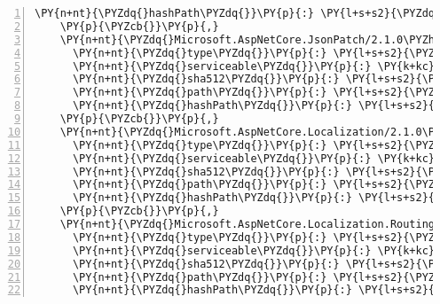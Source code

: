 \begin{Verbatim}[commandchars=\\\{\},numbers=left,firstnumber=1,stepnumber=1,numberblanklines=0]
      \PY{n+nt}{\PYZdq{}hashPath\PYZdq{}}\PY{p}{:} \PY{l+s+s2}{\PYZdq{}microsoft.aspnetcore.identity.ui.2.1.0\PYZhy{}rc1\PYZhy{}final.nupkg.sha512\PYZdq{}}
    \PY{p}{\PYZcb{}}\PY{p}{,}
    \PY{n+nt}{\PYZdq{}Microsoft.AspNetCore.JsonPatch/2.1.0\PYZhy{}rc1\PYZhy{}final\PYZdq{}}\PY{p}{:} \PY{p}{\PYZob{}}
      \PY{n+nt}{\PYZdq{}type\PYZdq{}}\PY{p}{:} \PY{l+s+s2}{\PYZdq{}package\PYZdq{}}\PY{p}{,}
      \PY{n+nt}{\PYZdq{}serviceable\PYZdq{}}\PY{p}{:} \PY{k+kc}{true}\PY{p}{,}
      \PY{n+nt}{\PYZdq{}sha512\PYZdq{}}\PY{p}{:} \PY{l+s+s2}{\PYZdq{}sha512\PYZhy{}lV+DDfCPgz2+gBELFHIb76Fj25lX6OFHE1wxH/OI3wkDXaD6+6Y5CiDBcD2S8vuMy7SDxhmzw0owrl6Lq46wyw==\PYZdq{}}\PY{p}{,}
      \PY{n+nt}{\PYZdq{}path\PYZdq{}}\PY{p}{:} \PY{l+s+s2}{\PYZdq{}microsoft.aspnetcore.jsonpatch/2.1.0\PYZhy{}rc1\PYZhy{}final\PYZdq{}}\PY{p}{,}
      \PY{n+nt}{\PYZdq{}hashPath\PYZdq{}}\PY{p}{:} \PY{l+s+s2}{\PYZdq{}microsoft.aspnetcore.jsonpatch.2.1.0\PYZhy{}rc1\PYZhy{}final.nupkg.sha512\PYZdq{}}
    \PY{p}{\PYZcb{}}\PY{p}{,}
    \PY{n+nt}{\PYZdq{}Microsoft.AspNetCore.Localization/2.1.0\PYZhy{}rc1\PYZhy{}final\PYZdq{}}\PY{p}{:} \PY{p}{\PYZob{}}
      \PY{n+nt}{\PYZdq{}type\PYZdq{}}\PY{p}{:} \PY{l+s+s2}{\PYZdq{}package\PYZdq{}}\PY{p}{,}
      \PY{n+nt}{\PYZdq{}serviceable\PYZdq{}}\PY{p}{:} \PY{k+kc}{true}\PY{p}{,}
      \PY{n+nt}{\PYZdq{}sha512\PYZdq{}}\PY{p}{:} \PY{l+s+s2}{\PYZdq{}sha512\PYZhy{}rtGHvNE4Mv57NcbxkJWwdgT/+FmvWOhQeS2kO8VMm5eE23+/o9OhxG2xhmQTLPZ4szKLNhohY9gr4Dcm3nbh1Q==\PYZdq{}}\PY{p}{,}
      \PY{n+nt}{\PYZdq{}path\PYZdq{}}\PY{p}{:} \PY{l+s+s2}{\PYZdq{}microsoft.aspnetcore.localization/2.1.0\PYZhy{}rc1\PYZhy{}final\PYZdq{}}\PY{p}{,}
      \PY{n+nt}{\PYZdq{}hashPath\PYZdq{}}\PY{p}{:} \PY{l+s+s2}{\PYZdq{}microsoft.aspnetcore.localization.2.1.0\PYZhy{}rc1\PYZhy{}final.nupkg.sha512\PYZdq{}}
    \PY{p}{\PYZcb{}}\PY{p}{,}
    \PY{n+nt}{\PYZdq{}Microsoft.AspNetCore.Localization.Routing/2.1.0\PYZhy{}rc1\PYZhy{}final\PYZdq{}}\PY{p}{:} \PY{p}{\PYZob{}}
      \PY{n+nt}{\PYZdq{}type\PYZdq{}}\PY{p}{:} \PY{l+s+s2}{\PYZdq{}package\PYZdq{}}\PY{p}{,}
      \PY{n+nt}{\PYZdq{}serviceable\PYZdq{}}\PY{p}{:} \PY{k+kc}{true}\PY{p}{,}
      \PY{n+nt}{\PYZdq{}sha512\PYZdq{}}\PY{p}{:} \PY{l+s+s2}{\PYZdq{}sha512\PYZhy{}vYnfWLXJyUArPPnNxuH3MqlHrCA4gAA2lopMWoXs/3TJHg4xdTDQionvSyF+TpLaVwBPKmhENKkV9LOfzDU2Hw==\PYZdq{}}\PY{p}{,}
      \PY{n+nt}{\PYZdq{}path\PYZdq{}}\PY{p}{:} \PY{l+s+s2}{\PYZdq{}microsoft.aspnetcore.localization.routing/2.1.0\PYZhy{}rc1\PYZhy{}final\PYZdq{}}\PY{p}{,}
      \PY{n+nt}{\PYZdq{}hashPath\PYZdq{}}\PY{p}{:} \PY{l+s+s2}{\PYZdq{}microsoft.aspnetcore.localization.routing.2.1.0\PYZhy{}rc1\PYZhy{}final.nupkg.sha512\PYZdq{}}

\end{Verbatim}
